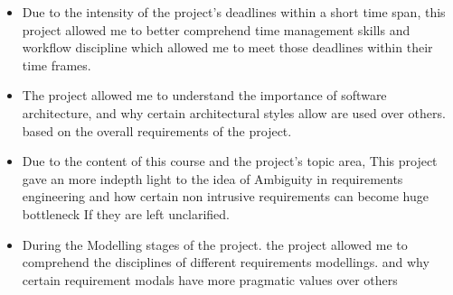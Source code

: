 \documentclass[30pt,a0,portrait]{a0poster}
\begin{document}
\begin{multicols}{2}
\begin{itemize}
\item Due to the intensity of the project's deadlines within a short time span, this project allowed me to better comprehend time management skills and workflow discipline which allowed me to meet those deadlines within their time frames. 

\item The project allowed me to understand the importance of software architecture, and why certain architectural styles allow are used over others. based on the overall requirements of the project.

\item Due to the content of this course and the project's topic area, This project gave an more indepth light to the idea of Ambiguity in requirements engineering and how certain non intrusive requirements can become huge bottleneck If they are left unclarified. 

\item During the Modelling stages of the project. the project allowed me to comprehend the disciplines of different requirements modellings. and why certain requirement modals have more pragmatic values over others 


\end{itemize}





\end{multicols}
\end{document}
